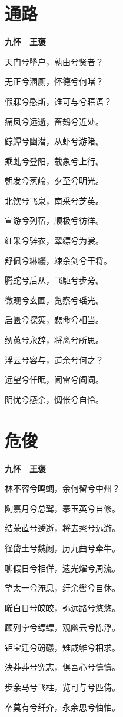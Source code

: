 \documentclass[12pt,a4paper]{ctexbook}
\begin{document}
\section{通路}
\textbf{九怀　王褒}\par\vspace{0.5em}
天门兮墬户，孰由兮贤者？\par
无正兮溷厕，怀德兮何睹？\par
假寐兮愍斯，谁可与兮寤语？\par
痛凤兮远逝，畜鴳兮近处。\par
鲸鱏兮幽潜，从虾兮游陼。\par
乘虬兮登阳，载象兮上行。\par
朝发兮葱岭，夕至兮明光。\par
北饮兮飞泉，南采兮芝英。\par
宣游兮列宿，顺极兮彷徉。\par
红采兮骍衣，翠缥兮为裳。\par
舒佩兮綝纚，竦余剑兮干将。\par
腾蛇兮后从，飞駏兮步旁。\par
微观兮玄圃，览察兮瑶光。\par
启匮兮探筴，悲命兮相当。\par
纫蕙兮永辞，将离兮所思。\par
浮云兮容与，道余兮何之？\par
远望兮仟眠，闻雷兮阗阗。\par
阴忧兮感余，惆怅兮自怜。\par

\section{危俊}
\textbf{九怀　王褒}\par\vspace{0.5em}
林不容兮鸣蜩，余何留兮中州？\par
陶嘉月兮总驾，搴玉英兮自修。\par
结荣茝兮逶逝，将去烝兮远游。\par
径岱土兮魏阙，历九曲兮牵牛。\par
聊假日兮相佯，遗光燿兮周流。\par
望太一兮淹息，纡余辔兮自休。\par
晞白日兮皎皎，弥远路兮悠悠。\par
顾列孛兮缥缥，观幽云兮陈浮。\par
钜宝迁兮砏磤，雉咸雊兮相求。\par
泱莽莽兮究志，惧吾心兮懤懤。\par
步余马兮飞柱，览可与兮匹俦。\par
卒莫有兮纤介，永余思兮怞怞。\par
\end{document}
